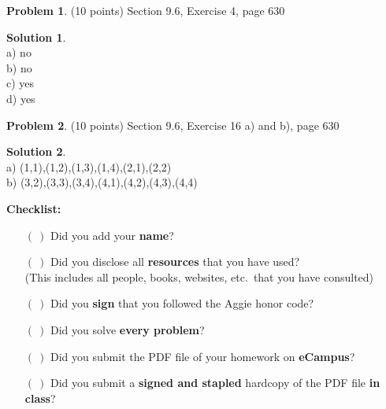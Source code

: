 \documentclass{article}
\theoremstyle{definition}
\newtheorem{problem}{Problem}
\newtheorem*{solution}{Solution}
\newcommand{\checklist}{\noindent\textbf{Checklist:}
\begin{enumerate}
\item[$(~)$] Did you add your \textbf{name}?
\item[$(~)$] Did you disclose all \textbf{resources} that you have used? \\
(This includes all people, books, websites, etc.\ that you have consulted)
\item[$(~)$] Did you \textbf{sign} that you followed the Aggie honor code? 
\item[$(~)$] Did you solve \textbf{every problem}? 
\item[$(~)$] Did you submit the PDF file of your homework on \textbf{eCampus}?
\item[$(~)$] Did you submit a \textbf{signed and stapled} hardcopy of the PDF file \textbf{in class}? 
\end{enumerate}
}
\begin{document}
\begin{problem} (10 points)
Section 9.6, Exercise 4, page 630
\end{problem}
\begin{solution}~\\
a) no\\
b) no\\
c) yes\\
d) yes\\
\end{solution}

\begin{problem} (10 points)
Section 9.6, Exercise 16 a) and b), page 630
\end{problem}
\begin{solution}~\\
a) (1,1),(1,2),(1,3),(1,4),(2,1),(2,2)\\
b) (3,2),(3,3),(3,4),(4,1),(4,2),(4,3),(4,4)\\
\end{solution}

\goodbreak
\checklist
\end{document}
